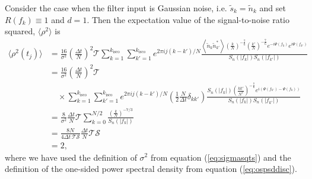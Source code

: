 Consider the case when the filter input is Gaussian noise, i.e. $\tilde{s}_k =
\tilde{n}_k$ and set $R(f_k)\equiv 1$ and $d = 1$.  Then the expectation
value of the signal-to-noise ratio squared, $\langle \rho^2
\rangle$ is
\begin{equation}
\begin{split}
\langle \rho^2(t_j) \rangle &=
\frac{16}{\sigma^2}\left(\frac{\Delta t}{N}\right)^2 \mathcal{T}
  \sum_{k=1}^{k_\mathrm{isco}} \sum_{k'=1}^{k_\mathrm{isco}} 
  e^{2\pi ij(k-k')/N} 
  \frac{\left\langle \tilde{n}_k \tilde{n}_{k'}^{\ast} \right\rangle 
        \left(\frac{k}{N}\right)^{-\frac{7}{6}} \left(\frac{k'}{N}\right)^{-\frac{7}{6}}
        e^{-i\Psi(f_k)} e^{i\Psi(f_{k'})}}
       {S_n\left(\left|f_k\right|\right)S_n\left(\left|f_{k'}\right|\right)} \\
&= 
\frac{16}{\sigma^2}\left(\frac{\Delta t}{N}\right)^2 \mathcal{T} \\
&\quad\times
  \sum_{k=1}^{k_\mathrm{isco}} \sum_{k'=1}^{k_\mathrm{isco}} 
  e^{2\pi ij(k-k')/N} \left(\frac{1}{2} \frac{N}{\Delta t}  \delta_{kk'} \right) 
  \frac{ S_n\left(\left|f_k\right|\right)
        \left(\frac{kk'}{N^2}\right)^{-\frac{7}{6}}
        e^{i ( \Psi(f_{k'}) - \Psi(f_k) )}}
       {S_n\left(\left|f_k\right|\right)S_n\left(\left|f_{k'}\right|\right)} \\
&= 
\frac{8}{\sigma^2} \frac{\Delta t}{N} \mathcal{T}
  \sum_{k=0}^{N/2}
  \frac{ \left(\frac{k}{N}\right)^{-7/3} }
       {S_n\left(\left|f_k\right|\right)} \\
&= 
\frac{8N}{4\Delta t\, \mathcal{T}\mathcal{S}} \frac{\Delta t}{N} \mathcal{T} \mathcal{S} \\
&= 2,
\label{eq:filternorm}
\end{split}
\end{equation}
where we have used the definition of $\sigma^2$ from equation
(\ref{eq:sigmasqts}) and the definition of the one-sided power spectral
density from equation (\ref{eq:ospsddisc}).

